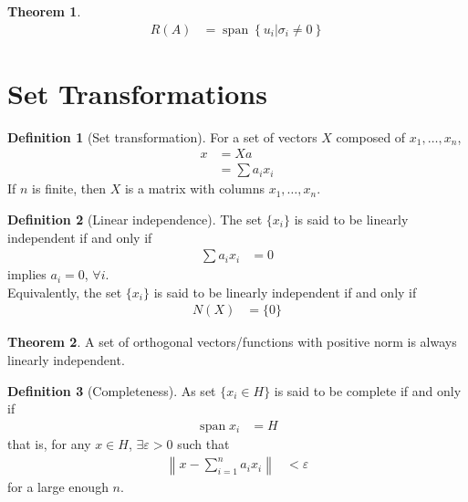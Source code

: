 \documentclass[titlepage, fleqn, a4paper, 12pt, twoside]{article}
\theoremstyle{definition}
\newtheorem{definition}{Definition}
\theoremstyle{theorem}
\newtheorem{theorem}{Theorem}
\DeclareMathOperator{\vspan}{\mathrm{span}}
\begin{document}
\begin{theorem}
	\begin{align*}
		R(A) &= \vspan\left\{ u_i \Big| \sigma_i \neq 0 \right\}
	\end{align*}
\end{theorem}

\section{Set Transformations}

\begin{definition}[Set transformation]
	For a set of vectors $X$ composed of $x_1,\dots,x_n$,
	\begin{align*}
		x &= X a\\
		&= \sum a_i x_i
	\end{align*}
	If $n$ is finite, then $X$ is a matrix with columns $x_1,\dots,x_n$.
\end{definition}

\begin{definition}[Linear independence]
	The set $\{x_i\}$ is said to be linearly independent if and only if
	\begin{align*}
		\sum a_i x_i &= 0
	\end{align*}
	implies $a_i = 0$, $\forall i$.\\
	Equivalently, the set $\{x_i\}$ is said to be linearly independent if and only if
	\begin{align*}
		N(X) &= \{0\}
	\end{align*}
\end{definition}

\begin{theorem}
	A set of orthogonal vectors/functions with positive norm is always linearly independent.
\end{theorem}

\begin{definition}[Completeness]
	As set $\{x_i \in H\}$ is said to be complete if and only if
	\begin{align*}
		\vspan{x_i} &= H
	\end{align*}
	that is, for any $x \in H$, $\exists \varepsilon > 0$ such that
	\begin{align*}
		\left\| x - \sum\limits_{i = 1}^{n} a_i x_i \right\| &< \varepsilon
	\end{align*}
	for a large enough $n$.
\end{definition}
\end{document}
